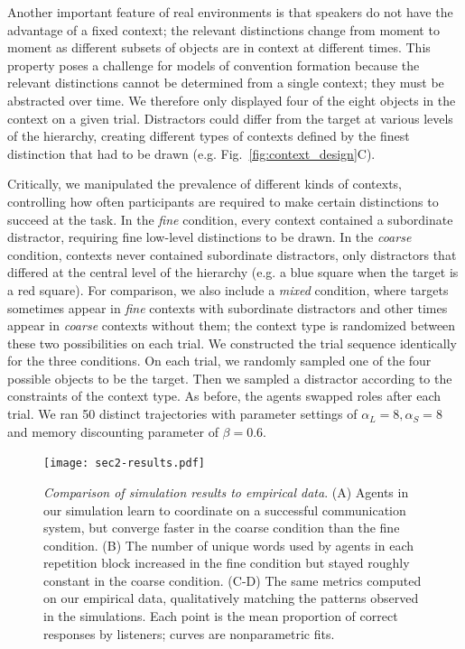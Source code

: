 Another important feature of real environments is that speakers do not have the advantage of a fixed context; the relevant distinctions change from moment to moment as different subsets of objects are in context at different times. 
This property poses a challenge for models of convention formation because the relevant distinctions cannot be determined from a single context; they must be abstracted over time.
We therefore only displayed four of the eight objects in the context on a given trial.
Distractors could differ from the target at various levels of the hierarchy, creating different types of contexts defined by the finest distinction that had to be drawn (e.g. Fig.~\ref{fig:context_design}C).  

Critically, we manipulated the prevalence of different kinds of contexts, controlling how often participants are required to make certain distinctions to succeed at the task. 
In the \emph{fine} condition, every context contained a subordinate distractor, requiring fine low-level distinctions to be drawn.
In the \emph{coarse} condition, contexts never contained subordinate distractors, only distractors that differed at the central level of the hierarchy (e.g. a blue square when the target is a red square).
For comparison, we also include a \emph{mixed} condition, where targets sometimes appear in \emph{fine} contexts with subordinate distractors and other times appear in \emph{coarse} contexts without them; the context type is randomized between these two possibilities on each trial.
We constructed the trial sequence identically for the three conditions. 
On each trial, we randomly sampled one of the four possible objects to be the target.
Then we sampled a distractor according to the constraints of the context type.
As before, the agents swapped roles after each trial. 
We ran 50 distinct trajectories with parameter settings of $\alpha_L=8, \alpha_S=8$ and memory discounting parameter of $\beta = 0.6$.%


\begin{figure}[t]
\begin{center}
\texttt{[image: sec2-results.pdf]}
\caption{\emph{Comparison of simulation results to empirical data}. (A) Agents in our simulation learn to coordinate on a successful communication system, but converge faster in the coarse condition than the fine condition.  (B) The number of unique words used by agents in each repetition block increased in the fine condition but stayed roughly constant in the coarse condition. (C-D) The same metrics computed on our empirical data, qualitatively matching the patterns observed in the simulations. Each point is the mean proportion of correct responses by listeners; curves are nonparametric fits.}
\label{fig:sec2Results}
\end{center}
\end{figure}

